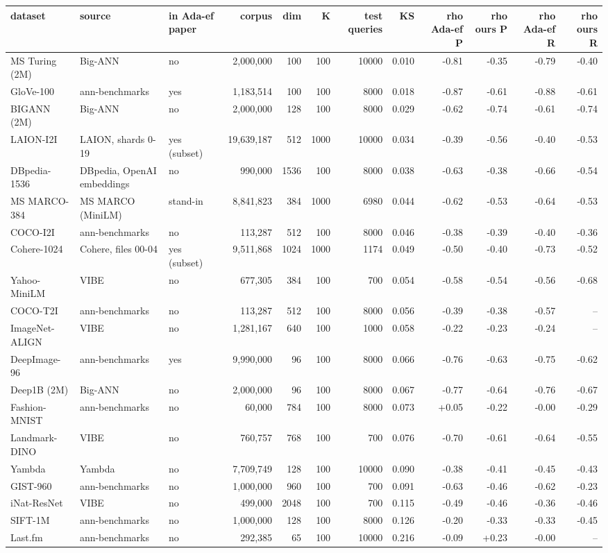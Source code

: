 \begin{tabular}{lllrrrrrrrrr}
\toprule
dataset & source & in Ada-ef paper & corpus & dim & K & test queries & KS & rho Ada-ef P & rho ours P & rho Ada-ef R & rho ours R \\
\midrule
MS Turing (2M) & Big-ANN & no & 2,000,000 & 100 & 100 & 10000 & 0.010 & -0.81 & -0.35 & -0.79 & -0.40 \\
GloVe-100 & ann-benchmarks & yes & 1,183,514 & 100 & 100 & 8000 & 0.018 & -0.87 & -0.61 & -0.88 & -0.61 \\
BIGANN (2M) & Big-ANN & no & 2,000,000 & 128 & 100 & 8000 & 0.029 & -0.62 & -0.74 & -0.61 & -0.74 \\
LAION-I2I & LAION, shards 0-19 & yes (subset) & 19,639,187 & 512 & 1000 & 10000 & 0.034 & -0.39 & -0.56 & -0.40 & -0.53 \\
DBpedia-1536 & DBpedia, OpenAI embeddings & no & 990,000 & 1536 & 100 & 8000 & 0.038 & -0.63 & -0.38 & -0.66 & -0.54 \\
MS MARCO-384 & MS MARCO (MiniLM) & stand-in & 8,841,823 & 384 & 1000 & 6980 & 0.044 & -0.62 & -0.53 & -0.64 & -0.53 \\
COCO-I2I & ann-benchmarks & no & 113,287 & 512 & 100 & 8000 & 0.046 & -0.38 & -0.39 & -0.40 & -0.36 \\
Cohere-1024 & Cohere, files 00-04 & yes (subset) & 9,511,868 & 1024 & 1000 & 1174 & 0.049 & -0.50 & -0.40 & -0.73 & -0.52 \\
Yahoo-MiniLM & VIBE & no & 677,305 & 384 & 100 & 700 & 0.054 & -0.58 & -0.54 & -0.56 & -0.68 \\
COCO-T2I & ann-benchmarks & no & 113,287 & 512 & 100 & 8000 & 0.056 & -0.39 & -0.38 & -0.57 & -- \\
ImageNet-ALIGN & VIBE & no & 1,281,167 & 640 & 100 & 1000 & 0.058 & -0.22 & -0.23 & -0.24 & -- \\
DeepImage-96 & ann-benchmarks & yes & 9,990,000 & 96 & 100 & 8000 & 0.066 & -0.76 & -0.63 & -0.75 & -0.62 \\
Deep1B (2M) & Big-ANN & no & 2,000,000 & 96 & 100 & 8000 & 0.067 & -0.77 & -0.64 & -0.76 & -0.67 \\
Fashion-MNIST & ann-benchmarks & no & 60,000 & 784 & 100 & 8000 & 0.073 & +0.05 & -0.22 & -0.00 & -0.29 \\
Landmark-DINO & VIBE & no & 760,757 & 768 & 100 & 700 & 0.076 & -0.70 & -0.61 & -0.64 & -0.55 \\
Yambda & Yambda & no & 7,709,749 & 128 & 100 & 10000 & 0.090 & -0.38 & -0.41 & -0.45 & -0.43 \\
GIST-960 & ann-benchmarks & no & 1,000,000 & 960 & 100 & 700 & 0.091 & -0.63 & -0.46 & -0.62 & -0.23 \\
iNat-ResNet & VIBE & no & 499,000 & 2048 & 100 & 700 & 0.115 & -0.49 & -0.46 & -0.36 & -0.46 \\
SIFT-1M & ann-benchmarks & no & 1,000,000 & 128 & 100 & 8000 & 0.126 & -0.20 & -0.33 & -0.33 & -0.45 \\
Last.fm & ann-benchmarks & no & 292,385 & 65 & 100 & 10000 & 0.216 & -0.09 & +0.23 & -0.00 & -- \\
\bottomrule
\end{tabular}
